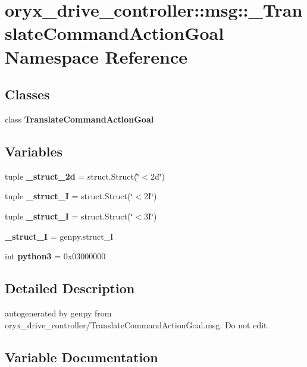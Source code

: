 \section{oryx\-\_\-drive\-\_\-controller\-:\-:msg\-:\-:\-\_\-\-Translate\-Command\-Action\-Goal \-Namespace \-Reference}
\label{namespaceoryx__drive__controller_1_1msg_1_1__TranslateCommandActionGoal}
\subsection*{\-Classes}
\begin{DoxyCompactItemize}
\item 
class {\bf \-Translate\-Command\-Action\-Goal}
\end{DoxyCompactItemize}
\subsection*{\-Variables}
\begin{DoxyCompactItemize}
\item 
tuple {\bf \-\_\-struct\-\_\-2d} = struct.\-Struct(\char`\"{}$<$2d\char`\"{})
\item 
tuple {\bf \-\_\-struct\-\_\-I} = struct.\-Struct(\char`\"{}$<$2\-I\char`\"{})
\item 
tuple {\bf \-\_\-struct\-\_\-I} = struct.\-Struct(\char`\"{}$<$3\-I\char`\"{})
\item 
{\bf \-\_\-struct\-\_\-\-I} = genpy.\-struct\-\_\-\-I
\item 
int {\bf python3} = 0x03000000
\end{DoxyCompactItemize}


\subsection{\-Detailed \-Description}
\begin{DoxyVerb}autogenerated by genpy from oryx_drive_controller/TranslateCommandActionGoal.msg. Do not edit.\end{DoxyVerb}
 

\subsection{\-Variable \-Documentation}
